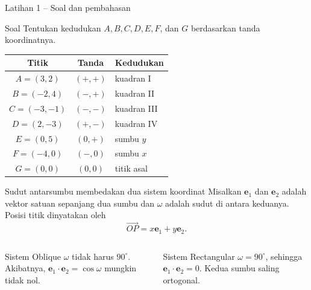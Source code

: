 \documentclass[aspectratio=169,11pt]{beamer}
\begin{document}
\begin{frame}{Latihan 1 -- Soal dan pembahasan}
    \begin{exampleblock}{Soal}
        Tentukan kedudukan $A,B,C,D,E,F$, dan $G$ berdasarkan tanda koordinatnya.
    \end{exampleblock}

    \renewcommand{\arraystretch}{1.15}
    \centering
    \begin{tabular}{c@{\quad}c@{\quad}l}
        \toprule
        Titik & Tanda & Kedudukan\\
        \midrule
        $A=(3,2)$ & $(+,+)$ & kuadran I\\
        $B=(-2,4)$ & $(-,+)$ & kuadran II\\
        $C=(-3,-1)$ & $(-,-)$ & kuadran III\\
        $D=(2,-3)$ & $(+,-)$ & kuadran IV\\
        $E=(0,5)$ & $(0,+)$ & sumbu $y$\\
        $F=(-4,0)$ & $(-,0)$ & sumbu $x$\\
        $G=(0,0)$ & $(0,0)$ & titik asal\\
        \bottomrule
    \end{tabular}
\end{frame}
\begin{frame}{Sudut antarsumbu membedakan dua sistem koordinat}
	\vspace{-1cm}
	Misalkan $\mathbf e_1$ dan $\mathbf e_2$ adalah vektor satuan sepanjang dua
	sumbu dan $\omega$ adalah sudut di antara keduanya. Posisi titik dinyatakan oleh
	\[
	\overrightarrow{OP}=x\mathbf e_1+y\mathbf e_2.
	\]
	
	\begin{columns}[T]
		\begin{block}{Sistem Oblique}
			$\omega$ tidak harus $90^\circ$. Akibatnya,
			$\mathbf e_1\cdot\mathbf e_2=\cos\omega$ mungkin tidak nol.
		\end{block}
		
		\begin{block}{Sistem Rectangular}
			$\omega=90^\circ$, sehingga
			$\mathbf e_1\cdot\mathbf e_2=0$. Kedua sumbu saling ortogonal.
		\end{block}
	\end{columns}
	
\end{frame}
\end{document}
